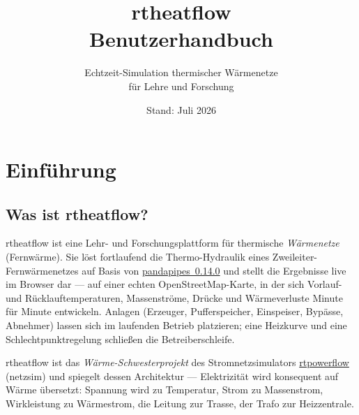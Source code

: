 \documentclass[11pt,a4paper,parskip=half]{scrreprt}
\title{rtheatflow\\\Large Benutzerhandbuch}
\subtitle{Echtzeit-Simulation thermischer Wärmenetze\\für Lehre und Forschung}
\author{}
\date{Stand: Juli 2026}
\begin{document}
\maketitle

\begin{center}
\end{center}

\tableofcontents

\chapter{Einführung}
\label{ch:einfuehrung}

\section{Was ist rtheatflow?}

rtheatflow ist eine Lehr- und Forschungsplattform für thermische
\emph{Wärmenetze} (Fernwärme). Sie löst fortlaufend die
Thermo-Hydraulik eines Zweileiter-Fernwärmenetzes auf Basis von
\href{https://github.com/e2nIEE/pandapipes}{pandapipes~0.14.0} und stellt die
Ergebnisse live im Browser dar --- auf einer echten OpenStreetMap-Karte, in der
sich Vorlauf- und Rücklauftemperaturen, Massenströme, Drücke und Wärmeverluste
Minute für Minute entwickeln. Anlagen (Erzeuger, Pufferspeicher, Einspeiser,
Bypässe, Abnehmer) lassen sich im laufenden Betrieb platzieren; eine Heizkurve
und eine Schlechtpunktregelung schließen die Betreiberschleife.

rtheatflow ist das \emph{Wärme-Schwesterprojekt} des Stromnetzsimulators
\href{https://github.com/markisbell/rtpowerflow}{rtpowerflow} (netzsim) und
spiegelt dessen Architektur --- Elektrizität wird konsequent auf Wärme
übersetzt: Spannung wird zu Temperatur, Strom zu Massenstrom, Wirkleistung zu
Wärmestrom, die Leitung zur Trasse, der Trafo zur Heizzentrale.
\end{document}
